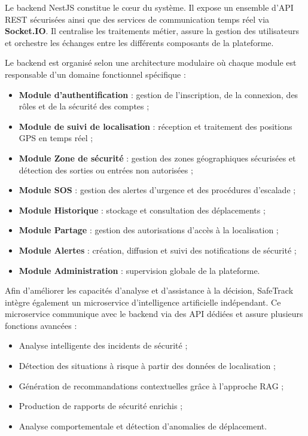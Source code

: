 Le backend NestJS constitue le cœur du système. Il expose un ensemble d'API REST sécurisées ainsi que des services de communication temps réel via \textbf{Socket.IO}. Il centralise les traitements métier, assure la gestion des utilisateurs et orchestre les échanges entre les différents composants de la plateforme.

Le backend est organisé selon une architecture modulaire où chaque module est responsable d'un domaine fonctionnel spécifique :

\begin{itemize}
    \item \textbf{Module d'authentification} : gestion de l'inscription, de la connexion, des rôles et de la sécurité des comptes ;
    
    \item \textbf{Module de suivi de localisation} : réception et traitement des positions GPS en temps réel ;
    
    \item \textbf{Module Zone de sécurité} : gestion des zones géographiques sécurisées et détection des sorties ou entrées non autorisées ;
    
    \item \textbf{Module SOS} : gestion des alertes d'urgence et des procédures d'escalade ;
    
    \item \textbf{Module Historique} : stockage et consultation des déplacements ;
    
    \item \textbf{Module Partage} : gestion des autorisations d'accès à la localisation ;
    
    \item \textbf{Module Alertes} : création, diffusion et suivi des notifications de sécurité ;
    
    \item \textbf{Module Administration} : supervision globale de la plateforme.
\end{itemize}

Afin d'améliorer les capacités d'analyse et d'assistance à la décision, SafeTrack intègre également un microservice d'intelligence artificielle indépendant. Ce microservice communique avec le backend via des API dédiées et assure plusieurs fonctions avancées :

\begin{itemize}
    \item Analyse intelligente des incidents de sécurité ;
    
    \item Détection des situations à risque à partir des données de localisation ;
    
    \item Génération de recommandations contextuelles grâce à l'approche RAG ;
    
    \item Production de rapports de sécurité enrichis ;
    
    \item Analyse comportementale et détection d'anomalies de déplacement.
\end{itemize}

